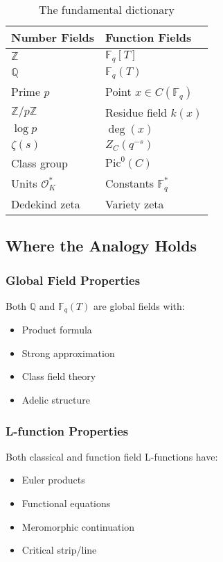 \begin{table}[h]
\centering
\begin{tabular}{|l|l|}
\hline
\textbf{Number Fields} & \textbf{Function Fields} \\
\hline
$\mathbb{Z}$ & $\mathbb{F}_q[T]$ \\
$\mathbb{Q}$ & $\mathbb{F}_q(T)$ \\
Prime $p$ & Point $x \in C(\mathbb{F}_q)$ \\
$\mathbb{Z}/p\mathbb{Z}$ & Residue field $k(x)$ \\
$\log p$ & $\deg(x)$ \\
$\zeta(s)$ & $Z_C(q^{-s})$ \\
Class group & $\text{Pic}^0(C)$ \\
Units $\mathcal{O}_K^*$ & Constants $\mathbb{F}_q^*$ \\
Dedekind zeta & Variety zeta \\
\hline
\end{tabular}
\caption{The fundamental dictionary}
\end{table}

\subsection{Where the Analogy Holds}

\subsubsection{Global Field Properties}

Both $\mathbb{Q}$ and $\mathbb{F}_q(T)$ are global fields with:
\begin{itemize}
\item Product formula
\item Strong approximation
\item Class field theory
\item Adelic structure
\end{itemize}

\subsubsection{L-function Properties}

Both classical and function field L-functions have:
\begin{itemize}
\item Euler products
\item Functional equations
\item Meromorphic continuation
\item Critical strip/line
\end{itemize}

